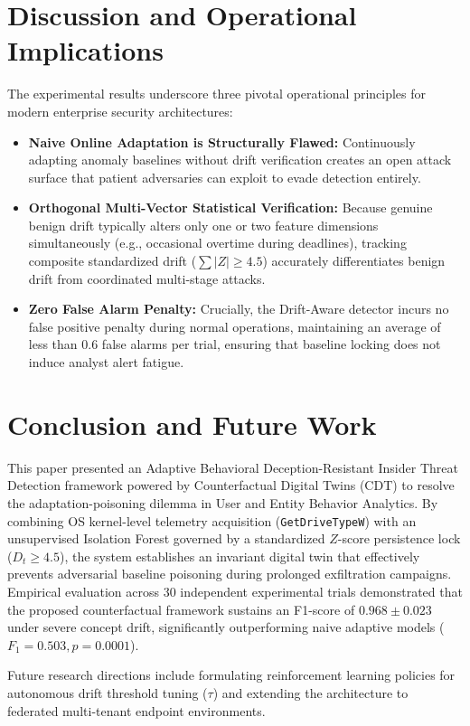 \documentclass[conference]{IEEEtran}
\begin{document}
\section{Discussion and Operational Implications}
The experimental results underscore three pivotal operational principles for modern enterprise security architectures:
\begin{itemize}
    \item \textbf{Naive Online Adaptation is Structurally Flawed:} Continuously adapting anomaly baselines without drift verification creates an open attack surface that patient adversaries can exploit to evade detection entirely.
    \item \textbf{Orthogonal Multi-Vector Statistical Verification:} Because genuine benign drift typically alters only one or two feature dimensions simultaneously (e.g., occasional overtime during deadlines), tracking composite standardized drift ($\sum |Z| \ge 4.5$) accurately differentiates benign drift from coordinated multi-stage attacks.
    \item \textbf{Zero False Alarm Penalty:} Crucially, the Drift-Aware detector incurs no false positive penalty during normal operations, maintaining an average of less than $0.6$ false alarms per trial, ensuring that baseline locking does not induce analyst alert fatigue.
\end{itemize}

\section{Conclusion and Future Work}
This paper presented an Adaptive Behavioral Deception-Resistant Insider Threat Detection framework powered by Counterfactual Digital Twins (CDT) to resolve the adaptation-poisoning dilemma in User and Entity Behavior Analytics. By combining OS kernel-level telemetry acquisition (\texttt{GetDriveTypeW}) with an unsupervised Isolation Forest governed by a standardized $Z$-score persistence lock ($D_t \ge 4.5$), the system establishes an invariant digital twin that effectively prevents adversarial baseline poisoning during prolonged exfiltration campaigns. Empirical evaluation across 30 independent experimental trials demonstrated that the proposed counterfactual framework sustains an F1-score of $0.968 \pm 0.023$ under severe concept drift, significantly outperforming naive adaptive models ($F_1 = 0.503, p = 0.0001$).

Future research directions include formulating reinforcement learning policies for autonomous drift threshold tuning ($\tau$) and extending the architecture to federated multi-tenant endpoint environments.
\end{document}

